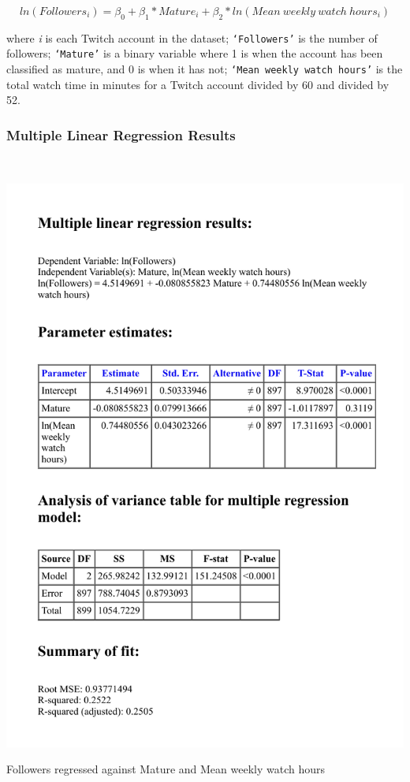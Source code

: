 \documentclass[12pt]{article}
\begin{document}
\begin{equation}
ln(Followers_{i}) = \beta_{0} + \beta_{1} \ast Mature_{i} + \beta_{2} \ast ln(Mean\ weekly\ watch\ hours_{i})
\label{eq:multi_linear_model}
\end{equation}

where \emph{i} is each Twitch account in the dataset; \texttt{`Followers'} is the number of followers; \texttt{`Mature'} is a binary variable where 1 is when the account has been classified as mature, and 0 is when it has not; \texttt{`Mean weekly watch hours'} is the total watch time in minutes for a Twitch account divided by 60 and divided by 52.

\subsubsection{Multiple Linear Regression Results}\

\begin{table}[H]
  \centering %
  \includegraphics[scale = 0.7]{../StatCrunch_Results/followers_mature_watch_hrs/multi_regression_table}
  \captionsetup{justification=centering, singlelinecheck=false, margin=2cm}
  \caption[Multiple Linear Regression for Followers by Mature]{Followers regressed against Mature and Mean weekly watch hours}
  \label{tab:multi_regression_tab}
\end{table}
\end{document}
